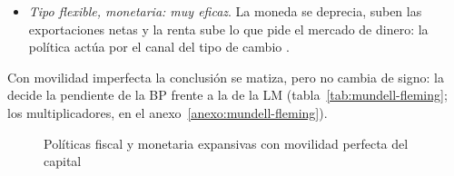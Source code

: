 \documentclass[11pt]{article}
\begin{document}
\begin{itemize}
\begin{itemize}
  \item \emph{Tipo flexible, monetaria: muy eficaz}. La moneda se deprecia, suben las exportaciones netas y la renta sube lo que pide el mercado de dinero: la política actúa por el canal del tipo de cambio .
  \end{itemize}
  Con movilidad imperfecta la conclusión se matiza, pero no cambia de signo: la decide la pendiente de la BP frente a la de la LM (tabla~\ref{tab:mundell-fleming}; los multiplicadores, en el anexo~\ref{anexo:mundell-fleming}).
\end{itemize}

\begin{figure}[H]
\centering
\caption{Políticas fiscal y monetaria expansivas con movilidad perfecta del capital}\label{fig:mundell-fleming-politicas}
\end{figure}
\end{document}
